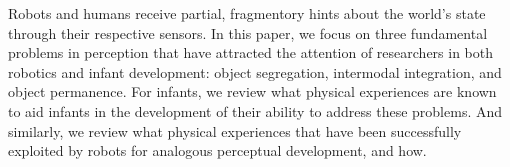 
Robots and humans receive partial, fragmentory hints about the world's
state through their respective sensors.  In this paper, we focus on
three fundamental problems in perception that have attracted the
attention of researchers in both robotics and infant development:
object segregation, intermodal integration, and object permanence.
For infants, we review what physical experiences are known to aid
infants in the development of their ability to address these problems.
And similarly, we review what physical experiences that have been
successfully exploited by robots for analogous perceptual development,
and how.


